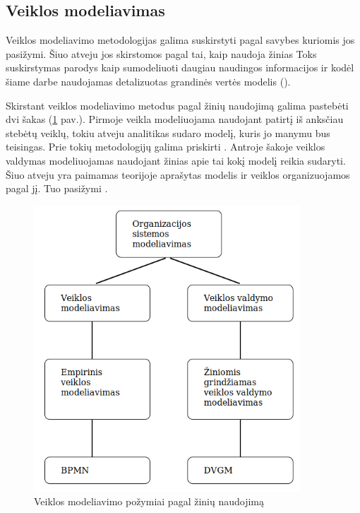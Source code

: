 \subsection{Veiklos modeliavimas}

Veiklos modeliavimo metodologijas galima suskirstyti pagal savybes kuriomis jos
pasižymi. Šiuo atveju jos skirstomos pagal tai, kaip naudoja žinias
Toks suskirstymas parodys kaip sumodeliuoti daugiau
naudingos informacijos ir kodėl šiame darbe naudojamas detalizuotas grandinės
vertės modelis (\DVCM{}).

Skirstant veiklos modeliavimo metodus pagal žinių naudojimą galima pastebėti dvi
šakas (\ref{img:business_system_modeling} pav.). Pirmoje veikla
modeliuojama naudojant patirtį iš anksčiau stebėtų veiklų, tokiu atveju
analitikas sudaro modelį, kuris jo manymu bus teisingas. Prie tokių metodologijų
galima priskirti \BPMN{} . Antroje šakoje veiklos valdymas modeliuojamas
naudojant žinias apie tai kokį modelį reikia sudaryti. Šiuo atveju yra paimamas
teorijoje aprašytas modelis ir veiklos organizuojamos pagal jį. Tuo pasižymi
\DVCM{}.

\begin{figure}[H]
	\centering
	\includegraphics[width=10cm]{./sections/modeling_methods_and_languages/img/business_system_modeling}
	\caption{Veiklos modeliavimo požymiai pagal žinių naudojimą}
	\label{img:business_system_modeling}
\end{figure}



